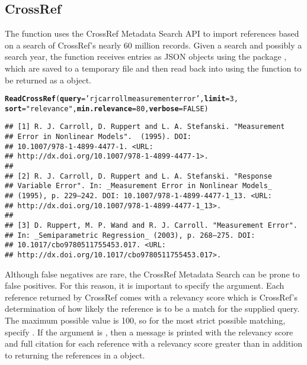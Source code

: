 \documentclass[article]{jss}\usepackage[]{graphicx}\usepackage[]{color}
\makeatletter
\newcommand{\hlnum}[1]{\textcolor[rgb]{0.125,0.125,1}{#1}}%
\newcommand{\hlstr}[1]{\textcolor[rgb]{0.125,0.125,1}{#1}}%
\newcommand{\hlstd}[1]{\textcolor[rgb]{0.251,0.251,0.282}{#1}}%
\newcommand{\hlkwc}[1]{\textcolor[rgb]{0.529,0,0.184}{\textbf{#1}}}%
\newcommand{\hlkwd}[1]{\textcolor[rgb]{0.251,0.251,0.282}{\textbf{#1}}}%
\newenvironment{kframe}{%
 \def\at@end@of@kframe{}%
 \ifinner\ifhmode%
  \def\at@end@of@kframe{\end{minipage}}%
  \begin{minipage}{\columnwidth}%
 \fi\fi%
 \def\FrameCommand##1{\hskip\@totalleftmargin \hskip-\fboxsep
 \colorbox{shadecolor}{##1}\hskip-\fboxsep
     \hskip-\linewidth \hskip-\@totalleftmargin \hskip\columnwidth}%
 \MakeFramed {\advance\hsize-\width
   \@totalleftmargin\z@ \linewidth\hsize
   \@setminipage}}%
 {\par\unskip\endMakeFramed%
 \at@end@of@kframe}
\newenvironment{knitrout}{}{} %
\makeatother
\begin{document}
\subsection{CrossRef}
The function  uses the CrossRef Metadata Search API to import references based on a search of CrossRef's nearly 60 million records.  Given a search and possibly a search year, the function receives \Bibtex{} entries as JSON objects using the  package \citep{RJSONIO}, which are saved to a temporary file and then read back into \R{} using the  function to be returned as a  object.
\begin{knitrout}
\color{fgcolor}\begin{kframe}
\begin{alltt}
\hlkwd{ReadCrossRef}\hlstd{(}\hlkwc{query} \hlstd{=} \hlstr{'rj carroll measurement error'}\hlstd{,} \hlkwc{limit} \hlstd{=} \hlnum{3}\hlstd{,}
             \hlkwc{sort} \hlstd{=} \hlstr{"relevance"}\hlstd{,} \hlkwc{min.relevance} \hlstd{=} \hlnum{80}\hlstd{,} \hlkwc{verbose} \hlstd{=} \hlnum{FALSE}\hlstd{)}
\end{alltt}
\begin{verbatim}
## [1] R. J. Carroll, D. Ruppert and L. A. Stefanski. "Measurement
## Error in Nonlinear Models".  (1995). DOI:
## 10.1007/978-1-4899-4477-1. <URL:
## http://dx.doi.org/10.1007/978-1-4899-4477-1>.
## 
## [2] R. J. Carroll, D. Ruppert and L. A. Stefanski. "Response
## Variable Error". In: _Measurement Error in Nonlinear Models_
## (1995), p. 229–242. DOI: 10.1007/978-1-4899-4477-1_13. <URL:
## http://dx.doi.org/10.1007/978-1-4899-4477-1_13>.
## 
## [3] D. Ruppert, M. P. Wand and R. J. Carroll. "Measurement Error".
## In: _Semiparametric Regression_ (2003), p. 268–275. DOI:
## 10.1017/cbo9780511755453.017. <URL:
## http://dx.doi.org/10.1017/cbo9780511755453.017>.
\end{verbatim}
\end{kframe}
\end{knitrout}


Although false negatives are rare, the CrossRef Metadata Search can be prone to false positives.  For this reason, it is important to specify the  argument.  Each reference returned by CrossRef comes with a relevancy score which is CrossRef's determination of how likely the reference is to be a match for the supplied query.  The maximum possible value is 100, so for the most strict possible matching, specify .  If the argument  is , then a message is printed with the relevancy score and full citation for each reference with a relevancy score greater than  in addition to returning the references in a  object.
\end{document}
